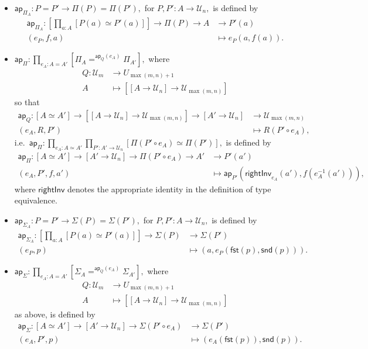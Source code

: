 \documentclass[a4paper]{article}
\theoremstyle{definition}
\theoremstyle{remark}
\renewcommand{\equiv}{\simeq}
\newcommand{\pathOver}[1]{=^{#1}}
\newcommand{\univVar}{\mathcal}
\newcommand{\U}{\univVar{U}}
\newcommand{\0}{\primType{0}}
\newcommand{\1}{\primType{1}}
\newcommand{\2}{\primType{2}}
\newcommand{\nm}{\mathsf}
\newcommand{\fst}{\nm{fst}}
\newcommand{\snd}{\nm{snd}}
\newcommand{\ap}{\nm{ap}}
\newcommand{\rightInv}{\nm{rightInv}}
\begin{document}
\begin{itemize}
  \item $\ap_{\Pi_A} : P = P' \to \Pi(P) = \Pi(P'),$ for $P,P' : A \to \U_n,$ is defined by
  \begin{align*}
    \ap_{\Pi_A} : \left[\prod_{a : A} [P(a) \equiv P'(a)]\right] \to \Pi(P) \to A &\to     P'(a)\\
                  (e_P,f,a)                                                       &\mapsto e_P(a,f(a)).
  \end{align*}

  \item $\ap_\Pi : \prod_{e_A : A = A'} [\Pi_A \pathOver{\ap_Q(e_A)} \Pi_{A'}],$ where
  \begin{align*}
    Q : \U_m &\to     U_{\max(m,n)+1}\\
        A    &\mapsto [[A \to \U_n] \to \U_{\max(m,n)}]
  \end{align*}
  so that
  \begin{align*}
    \ap_Q : [A \equiv A'] \to [[A \to \U_n] \to \U_{\max(m,n)}] \to [A' \to \U_n] &\to     \U_{\max(m,n)}\\
            (e_A,R,P')                                                            &\mapsto R(P' \circ e_A),
  \end{align*}
  i.e.\ $\ap_\Pi : \prod_{e_A : A \equiv A'} \prod_{P' : A' \to \U_n} [\Pi(P' \circ e_A) \equiv \Pi(P')],$
  is defined by
  \begin{align*}
    \ap_\Pi : [A \equiv A'] \to [A' \to \U_n] \to \Pi(P' \circ e_A) \to A' &\to     P'(a')\\
              (e_A,P',f,a')                                                &\mapsto \ap_{P'}(\rightInv_{e_A}(a'),f(e_A^{-1}(a'))),
  \end{align*}
  where $\rightInv$ denotes the appropriate identity in the definition of type equivalence.

  \item $\ap_{\Sigma_A} : P = P' \to \Sigma(P) = \Sigma(P'),$ for $P,P' : A \to \U_n,$ is
  defined by
  \begin{align*}
    \ap_{\Sigma_A} : \left[\prod_{a : A} [P(a) \equiv P'(a)]\right] \to \Sigma(P) &\to     \Sigma(P')\\
                     (e_P,p)                                                      &\mapsto (a,e_P(\fst(p),\snd(p))).
  \end{align*}

  \item $\ap_\Sigma : \prod_{e_A : A = A'} [\Sigma_A \pathOver{\ap_Q(e_A)} \Sigma_{A'}],$ where
  \begin{align*}
    Q : \U_m &\to     U_{\max(m,n)+1}\\
        A    &\mapsto [[A \to \U_n] \to \U_{\max(m,n)}]
  \end{align*}
  as above, is defined by
  \begin{align*}
    \ap_\Sigma : [A \equiv A'] \to [A' \to \U_n] \to \Sigma(P' \circ e_A) &\to     \Sigma(P')\\
                 (e_A,P',p)                                               &\mapsto (e_A(\fst(p)),\snd(p)).
  \end{align*}


\end{itemize}
\end{document}
